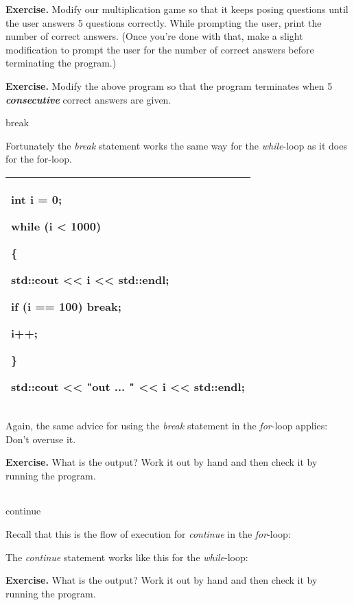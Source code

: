 \documentclass[
]{article}
\begin{document}
\textbf{Exercise.} Modify our multiplication game so that it keeps
posing questions until the user answers 5 questions correctly. While
prompting the user, print the number of correct answers. (Once you're
done with that, make a slight modification to prompt the user for the
number of correct answers before terminating the program.)

\textbf{Exercise.} Modify the above program so that the program
terminates when 5 \emph{\textbf{consecutive}} correct answers are given.

break

Fortunately the \emph{break} statement works the same way for the
\emph{while}-loop as it does for the for-loop.

\begin{longtable}[]{@{}l@{}}
\toprule
\endhead
\begin{minipage}[t]{0.97\columnwidth}\raggedright
int i = 0;

while (i \textless{} 1000)

\{

std::cout \textless\textless{} i \textless\textless{} std::endl;

if (i == 100) break;

i++;

\}

std::cout \textless\textless{} "out ... " \textless\textless{} i
\textless\textless{} std::endl;\strut
\end{minipage}\tabularnewline
\bottomrule
\end{longtable}

Again, the same advice for using the \emph{break} statement in the
\emph{for}-loop applies: Don't overuse it.

\textbf{Exercise.} What is the output? Work it out by hand and then
check it by running the program.

\begin{longtable}[]{@{}@{}}
\toprule
\endhead
\bottomrule
\end{longtable}

continue

Recall that this is the flow of execution for \emph{continue} in the
\emph{for}-loop:

The \emph{continue} statement works like this for the \emph{while}-loop:

\textbf{Exercise.} What is the output? Work it out by hand and then
check it by running the program.

\begin{longtable}[]{@{}@{}}
\toprule
\endhead
\bottomrule
\end{longtable}
\end{document}
